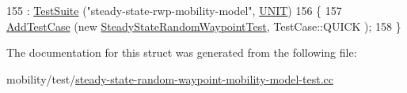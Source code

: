 \begin{DoxyCode}
155                                         : \hyperlink{classns3_1_1TestSuite_a904b0c40583b744d30908aeb94636d1a}{TestSuite} (\textcolor{stringliteral}{"steady-state-rwp-mobility-model"}, 
      \hyperlink{classns3_1_1TestSuite_a1ebfcab34ec8161e085e8e3a1855eae0a3885375a3787abf60431f8454b3cadbd}{UNIT})
156   \{
157     \hyperlink{classns3_1_1TestCase_a3718088e3eefd5d6454569d2e0ddd835}{AddTestCase} (\textcolor{keyword}{new} \hyperlink{classSteadyStateRandomWaypointTest}{SteadyStateRandomWaypointTest}, TestCase::QUICK
      );
158   \}
\end{DoxyCode}


The documentation for this struct was generated from the following file\+:\begin{DoxyCompactItemize}
\item 
mobility/test/\hyperlink{steady-state-random-waypoint-mobility-model-test_8cc}{steady-\/state-\/random-\/waypoint-\/mobility-\/model-\/test.\+cc}\end{DoxyCompactItemize}

